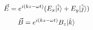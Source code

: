 \documentclass{article}
\begin{document}
\DeclarePairedDelimiter\bra{\langle}{\rvert}
\DeclarePairedDelimiter\ket{\lvert}{\rangle}
\DeclarePairedDelimiterX{}

$$
\vec{E} = e^{i(kz-\omega t)}(E_x \ket{\hat{i}} + E_y \ket{\hat{j}})
$$
$$
\vec{B} = e^{i(kz-\omega t)}B_z \ket{\hat{k}}
$$
\end{document}
